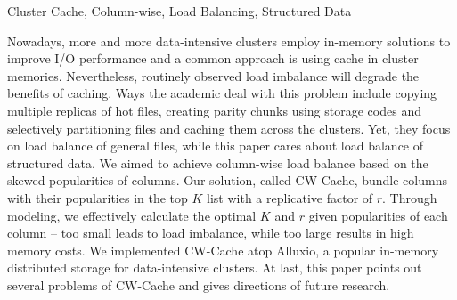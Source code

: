 
\begin{abstract}{集群缓存，列级别，负载均衡，结构化数据}

    目前越来越多的数据密集型集群部署内存计算方案来提高I/O性能，在集群内存使用缓存是一种普遍做法。然而负载不均这一集群缓存中常见的问题则会损害缓存带来的好处。学术界应对这一问题的方法包括将热门的文件复制多份、用存储编码为文件创建同等分区、选择性地将文件分割成多份来分散存储。然而这些方法均关注一般意义上的文件的负载均衡，而本文关注的是结构化数据的负载均衡，根据数据表中各个列的访问热度倾斜实现列级别的负载均衡。我们的解决方案称为CW-Cache，将数据表中访问热度排在前$K$的列一起复制$r$份缓存在集群中。我们通过数学建模，在数据表各个列的热度确定的情况下，高效地计算出最优的$K$和$r$——二者太小不足以实现负载均衡，太大则会增大内存开销。我们在分布式内存文件系统Alluxio上实现了CW-Cache，
    本文最后提出了CW-Cache目前存在的问题，为下一步研究提出方向。
    \end{abstract}
    
    \begin{englishabstract}{Cluster Cache, Column-wise, Load Balancing,  Structured Data}
    
    Nowadays, more and more data-intensive clusters employ in-memory solutions to improve I/O performance and a common approach is using cache in cluster memories. Nevertheless, routinely observed load imbalance will degrade the benefits of caching. Ways the academic deal with this problem include copying multiple replicas of hot files, creating parity chunks using storage codes and selectively partitioning files and caching them across  the clusters. Yet, they focus on load balance of general files, while this paper cares about load balance of structured data. We aimed to achieve column-wise load balance based on the skewed popularities of columns. Our solution, called CW-Cache, bundle columns with their popularities in the top $K$ list with a replicative factor of $r$. Through modeling, we effectively calculate the optimal $K$ and $r$ given popularities of each column -- too small leads to load imbalance, while too large results in high memory costs. We implemented CW-Cache atop Alluxio, a popular in-memory distributed storage for data-intensive clusters.
    At last, this paper points out several problems of CW-Cache and gives directions of future research.
    \end{englishabstract}

